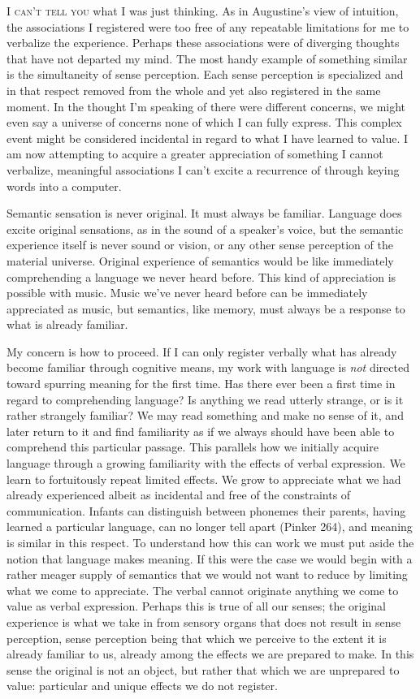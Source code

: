 \documentclass[
]{memoir}
\begin{document}
\lettrine[lines=3, findent=0em, nindent=0.1em, lhang=0]{I}{ can’t tell you}
what I was just thinking. As in Augustine's view of intuition, the
associations I registered were too free of any repeatable limitations
for me to verbalize the experience. Perhaps these associations were of
diverging thoughts that have not departed my mind. The most handy
example of something similar is the simultaneity of sense perception.
Each sense perception is specialized and in that respect removed from
the whole and yet also registered in the same moment. In the thought I'm
speaking of there were different concerns, we might even say a universe
of concerns none of which I can fully express. This complex event might
be considered incidental in regard to what I have learned to value. I am
now attempting to acquire a greater appreciation of something I cannot
verbalize, meaningful associations I can't excite a recurrence of
through keying words into a computer.

Semantic sensation is never original. It must always be familiar.
Language does excite original sensations, as in the sound of a speaker's
voice, but the semantic experience itself is never sound or vision, or
any other sense perception of the material universe. Original experience
of semantics would be like immediately comprehending a language we never
heard before. This kind of appreciation is possible with music. Music
we've never heard before can be immediately appreciated as music, but
semantics, like memory, must always be a response to what is already
familiar.

My concern is how to proceed. If I can only register verbally what has
already become familiar through cognitive means, my work with language
is \emph{not} directed toward spurring meaning for the first time. Has
there ever been a first time in regard to comprehending language? Is
anything we read utterly strange, or is it rather strangely familiar? We
may read something and make no sense of it, and later return to it and
find familiarity as if we always should have been able to comprehend
this particular passage. This parallels how we initially acquire
language through a growing familiarity with the effects of verbal
expression. We learn to fortuitously repeat limited effects. We grow to
appreciate what we had already experienced albeit as incidental and free
of the constraints of communication. Infants can distinguish between
phonemes their parents, having learned a particular language, can no
longer tell apart (Pinker 264), and meaning is similar in this respect.
To understand how this can work we must put aside the notion that
language makes meaning. If this were the case we would begin with a
rather meager supply of semantics that we would not want to reduce by
limiting what we come to appreciate. The verbal cannot originate
anything we come to value as verbal expression. Perhaps this is true of
all our senses; the original experience is what we take in from sensory
organs that does not result in sense perception, sense perception being
that which we perceive to the extent it is already familiar to us,
already among the effects we are prepared to make. In this sense the
original is not an object, but rather that which we are unprepared to
value: particular and unique effects we do not register.
\end{document}
